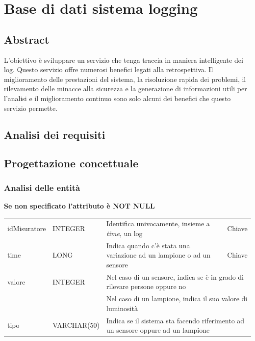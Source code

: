\section{Base di dati sistema logging}

\subsection{Abstract}

L’obiettivo è sviluppare un servizio che tenga traccia in maniera intelligente dei log. Questo servizio offre numerosi benefici legati alla retrospettiva. Il miglioramento delle prestazioni del sistema, la risoluzione rapida dei problemi, il rilevamento delle minacce alla sicurezza e la generazione di informazioni utili per l'analisi e il miglioramento continuo sono solo alcuni dei benefici che questo servizio permette.

\subsection{Analisi dei requisiti}

\subsection{Progettazione concettuale}

\subsubsection{Analisi delle entità}

\textbf{Se non specificato l'attributo è NOT NULL}

\begin{center}
    \begin{tabularx}{\textwidth}{|l|l|l|X|}
        \hline
        \rowcolor{gray!30}
        \multicolumn{4}{|c|}{\textbf{LOG}}\\
        \hline
        idMisuratore & INTEGER & Identifica univocamente, insieme a {\it{time}}, un log & Chiave\\
        \hline
        time & LONG & Indica quando c'è stata una variazione ad un lampione o ad un sensore & Chiave\\
        \hline
        valore & INTEGER & \multicolumn{2}{l|}{Nel caso di un sensore, indica se è in grado di rilevare persone oppure no} \\
        & & \multicolumn{2}{l|}{Nel caso di un lampione, indica il suo valore di luminosità} \\
        \hline
        tipo & VARCHAR(50) & \multicolumn{2}{l|}{Indica se il sistema sta facendo riferimento ad un sensore oppure ad un lampione} \\
        \hline
    \end{tabularx}
\end{center}

